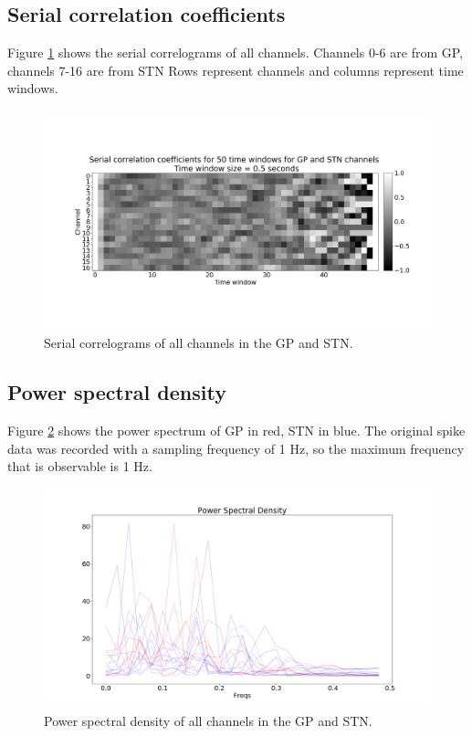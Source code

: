 \documentclass{kththesis}
\begin{document}
\subsection{Serial correlation coefficients}

Figure \ref{fig:corr3} shows the serial correlograms of all channels. Channels 0-6 are from GP, channels 7-16 are from STN
Rows represent channels and columns represent time windows.

\begin{figure}[H]
    \centering
    \centerline{\includegraphics[width=1\textwidth]{images/spiking/autocorr_all.png}}
    \caption{Serial correlograms of all channels in the GP and STN.}
    \label{fig:corr3}
\end{figure}

\subsection{Power spectral density}

Figure \ref{fig:PS3} shows the power spectrum of GP in red, STN in blue.
The original spike data was recorded with a sampling frequency of 1 Hz, so the maximum frequency that is observable is 1 Hz.

\begin{figure}[H]
    \centering
    \centerline{\includegraphics[width=1\textwidth]{images/spiking/powerSpect_all.png}}
    \caption{Power spectral density of all channels in the GP and STN.}
    \label{fig:PS3}
\end{figure}
\end{document}

